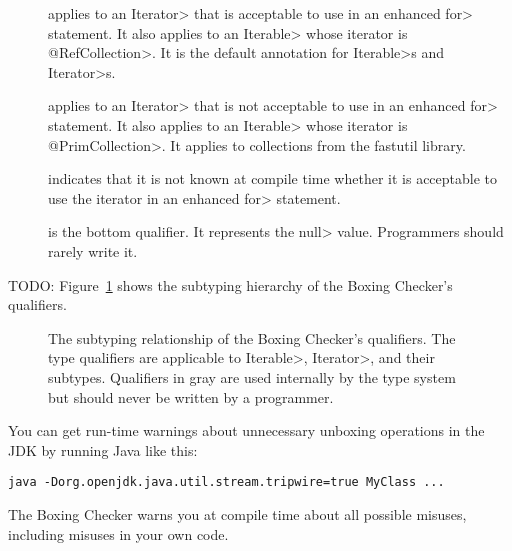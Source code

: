 \begin{description}

\item[]
  applies to an \<Iterator> that is acceptable to use in an enhanced \<for>
  statement.
  It also applies to an \<Iterable> whose iterator is \<@RefCollection>.
  It is the default annotation for \<Iterable>s and \<Iterator>s.

\item[]
  applies to an \<Iterator> that is not acceptable to use in an enhanced \<for>
  statement.
  It also applies to an \<Iterable> whose iterator is \<@PrimCollection>.
  It applies to collections from the fastutil library.

\item[]
  indicates that it is not known at compile time whether it is acceptable
  to use the iterator in an enhanced \<for> statement.

\item[]
  is the bottom qualifier.  It represents the \<null> value.  Programmers
  should rarely write it.

\end{description}

TODO:
Figure~\ref{fig-enhancedfor-hierarchy} shows the subtyping hierarchy of the
Boxing Checker's qualifiers.

\begin{figure}
\caption{The subtyping relationship of the Boxing Checker's qualifiers.
  The type qualifiers are applicable to \<Iterable>, \<Iterator>, and
  their subtypes.  Qualifiers in gray are used internally by the type
  system but should never be written by a programmer.}
\label{fig-enhancedfor-hierarchy}
\end{figure}



You can get run-time warnings about unnecessary unboxing operations in the
JDK by running Java like this:

\begin{Verbatim}
java -Dorg.openjdk.java.util.stream.tripwire=true MyClass ...
\end{Verbatim}

The Boxing Checker warns you at compile time about all possible
misuses, including misuses in your own code.




